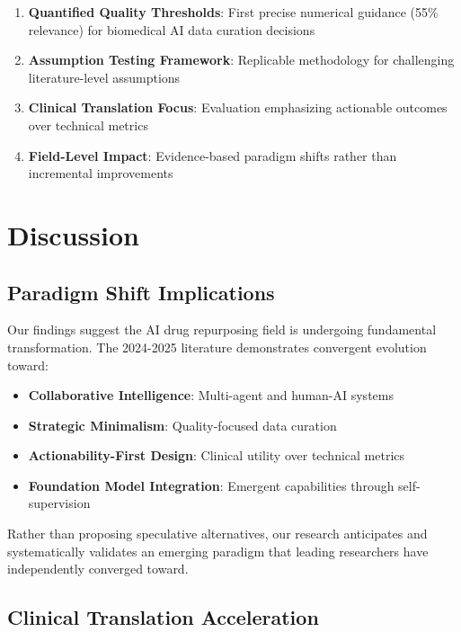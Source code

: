 \documentclass{article}
\begin{document}
\begin{enumerate}
    \item \textbf{Quantified Quality Thresholds}: First precise numerical guidance (55\% relevance) for biomedical AI data curation decisions
    \item \textbf{Assumption Testing Framework}: Replicable methodology for challenging literature-level assumptions
    \item \textbf{Clinical Translation Focus}: Evaluation emphasizing actionable outcomes over technical metrics
    \item \textbf{Field-Level Impact}: Evidence-based paradigm shifts rather than incremental improvements
\end{enumerate}

\section{Discussion}

\subsection{Paradigm Shift Implications}

Our findings suggest the AI drug repurposing field is undergoing fundamental transformation. The 2024-2025 literature demonstrates convergent evolution toward:

\begin{itemize}
    \item \textbf{Collaborative Intelligence}: Multi-agent and human-AI systems \cite{pharmaswarm_2025, drugmcts_2025}
    \item \textbf{Strategic Minimalism}: Quality-focused data curation \cite{kpaths_2025, drugclip_2024}
    \item \textbf{Actionability-First Design}: Clinical utility over technical metrics \cite{rarebench_2024, kg_explainable_rare_2024}
    \item \textbf{Foundation Model Integration}: Emergent capabilities through self-supervision \cite{videomol_2024, omnibioTE_2024}
\end{itemize}

Rather than proposing speculative alternatives, our research anticipates and systematically validates an emerging paradigm that leading researchers have independently converged toward.

\subsection{Clinical Translation Acceleration}
\end{document}
